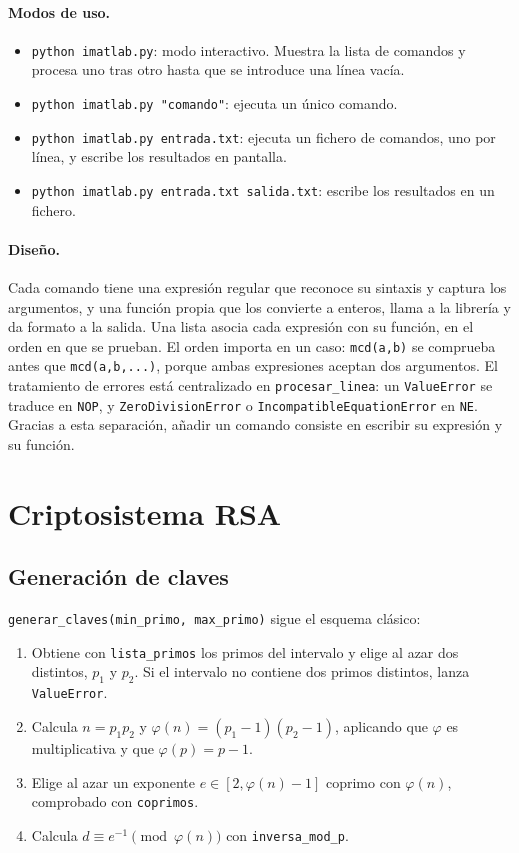 \documentclass[11pt,a4paper]{article}
\newcommand{\code}[1]{\texttt{#1}}
\begin{document}
\paragraph{Modos de uso.}
\begin{itemize}
\item \code{python imatlab.py}: modo interactivo. Muestra la lista de comandos y procesa uno tras otro hasta que se introduce una línea vacía.
\item \code{python imatlab.py "comando"}: ejecuta un único comando.
\item \code{python imatlab.py entrada.txt}: ejecuta un fichero de comandos, uno por línea, y escribe los resultados en pantalla.
\item \code{python imatlab.py entrada.txt salida.txt}: escribe los resultados en un fichero.
\end{itemize}

\paragraph{Diseño.}
Cada comando tiene una expresión regular que reconoce su sintaxis y captura los argumentos, y una función propia que los convierte a enteros, llama a la librería y da formato a la salida. Una lista asocia cada expresión con su función, en el orden en que se prueban. El orden importa en un caso: \code{mcd(a,b)} se comprueba antes que \code{mcd(a,b,...)}, porque ambas expresiones aceptan dos argumentos. El tratamiento de errores está centralizado en \code{procesar\_linea}: un \code{ValueError} se traduce en \code{NOP}, y \code{ZeroDivisionError} o \code{IncompatibleEquationError} en \code{NE}. Gracias a esta separación, añadir un comando consiste en escribir su expresión y su función.

\section{Criptosistema RSA}

\subsection{Generación de claves}

\code{generar\_claves(min\_primo, max\_primo)} sigue el esquema clásico:

\begin{enumerate}
\item Obtiene con \code{lista\_primos} los primos del intervalo y elige al azar dos distintos, $p_1$ y $p_2$. Si el intervalo no contiene dos primos distintos, lanza \code{ValueError}.
\item Calcula $n=p_1p_2$ y $\varphi(n)=(p_1-1)(p_2-1)$, aplicando que $\varphi$ es multiplicativa y que $\varphi(p)=p-1$.
\item Elige al azar un exponente $e\in[2,\varphi(n)-1]$ coprimo con $\varphi(n)$, comprobado con \code{coprimos}.
\item Calcula $d\equiv e^{-1} \pmod{\varphi(n)}$ con \code{inversa\_mod\_p}.
\end{enumerate}
\end{document}
